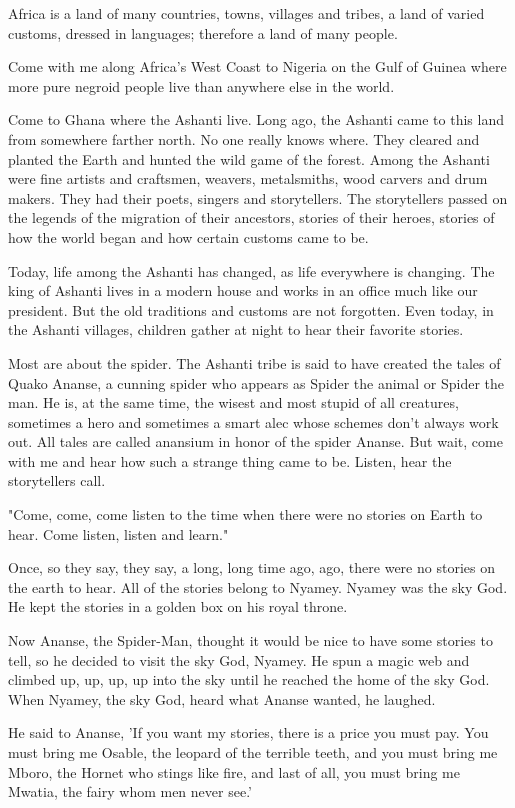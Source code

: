 Africa is a land of many countries, towns, villages and tribes, a land of varied customs, dressed in languages; therefore a land of many people.

Come with me along Africa's West Coast to Nigeria on the Gulf of Guinea where more pure negroid people live than anywhere else in the world.

Come to Ghana where the Ashanti live. Long ago, the Ashanti came to this land from somewhere farther north. No one really knows where. They cleared and planted the Earth and hunted the wild game of the forest. Among the Ashanti were fine artists and craftsmen, weavers, metalsmiths, wood carvers and drum makers. They had their poets, singers and storytellers. The storytellers passed on the legends of the migration of their ancestors, stories of their heroes, stories of how the world began and how certain customs came to be.

Today, life among the Ashanti has changed, as life everywhere is changing. The king of Ashanti lives in a modern house and works in an office much like our president. But the old traditions and customs are not forgotten. Even today, in the Ashanti villages, children gather at night to hear their favorite stories.

Most are about the spider. The Ashanti tribe is said to have created the tales of Quako Ananse, a cunning spider who appears as Spider the animal or Spider the man. He is, at the same time, the wisest and most stupid of all creatures, sometimes a hero and sometimes a smart alec whose schemes don't always work out. All tales are called anansium in honor of the spider Ananse. But wait, come with me and hear how such a strange thing came to be. Listen, hear the storytellers call.

"Come, come, come listen to the time when there were no stories on Earth to hear. Come listen, listen and learn."

Once, so they say, they say, a long, long time ago, ago, there were no stories on the earth to hear. All of the stories belong to Nyamey. Nyamey was the sky God. He kept the stories in a golden box on his royal throne.

Now Ananse, the Spider-Man, thought it would be nice to have some stories to tell, so he decided to visit the sky God, Nyamey. He spun a magic web and climbed up, up, up, up into the sky until he reached the home of the sky God. When Nyamey, the sky God, heard what Ananse wanted, he laughed.

He said to Ananse, 'If you want my stories, there is a price you must pay. You must bring me Osable, the leopard of the terrible teeth, and you must bring me Mboro, the Hornet who stings like fire, and last of all, you must bring me Mwatia, the fairy whom men never see.'

